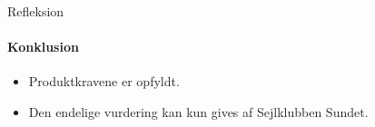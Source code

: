 
\begin{frame}{Refleksion}
\framesubtitle{Konklusion}
\begin{itemize}
\item Produktkravene er opfyldt.
\item Den endelige vurdering kan kun gives af Sejlklubben Sundet.
\end{itemize}
\end{frame}